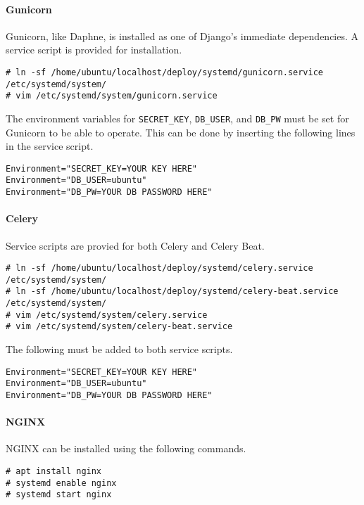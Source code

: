 \paragraph{Gunicorn}

Gunicorn, like Daphne, is installed as one of Django's immediate dependencies.
A service script is provided for installation.
\begin{lstlisting}
# ln -sf /home/ubuntu/localhost/deploy/systemd/gunicorn.service /etc/systemd/system/
# vim /etc/systemd/system/gunicorn.service
\end{lstlisting}
The environment variables for \lstinline{SECRET_KEY}, \lstinline{DB_USER},
and \lstinline{DB_PW} must be set for Gunicorn to be able to operate.
This can be done by inserting the following lines in the service script.
\begin{lstlisting}
Environment="SECRET_KEY=YOUR KEY HERE"
Environment="DB_USER=ubuntu"
Environment="DB_PW=YOUR DB PASSWORD HERE"
\end{lstlisting}

\paragraph{Celery}

Service scripts are provied for both Celery and Celery Beat.

\begin{lstlisting}
# ln -sf /home/ubuntu/localhost/deploy/systemd/celery.service /etc/systemd/system/
# ln -sf /home/ubuntu/localhost/deploy/systemd/celery-beat.service /etc/systemd/system/
# vim /etc/systemd/system/celery.service
# vim /etc/systemd/system/celery-beat.service
\end{lstlisting}
The following must be added to both service scripts.
\begin{lstlisting}
Environment="SECRET_KEY=YOUR KEY HERE"
Environment="DB_USER=ubuntu"
Environment="DB_PW=YOUR DB PASSWORD HERE"
\end{lstlisting}


\paragraph{NGINX}

NGINX can be installed using the following commands.
\begin{lstlisting}
# apt install nginx
# systemd enable nginx
# systemd start nginx
\end{lstlisting}

